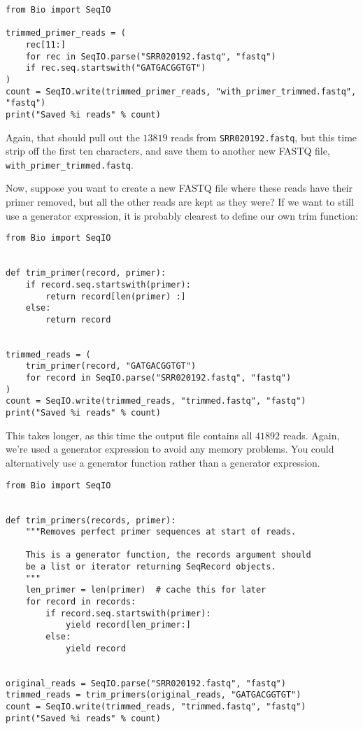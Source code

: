 \begin{verbatim}
from Bio import SeqIO

trimmed_primer_reads = (
    rec[11:]
    for rec in SeqIO.parse("SRR020192.fastq", "fastq")
    if rec.seq.startswith("GATGACGGTGT")
)
count = SeqIO.write(trimmed_primer_reads, "with_primer_trimmed.fastq", "fastq")
print("Saved %i reads" % count)
\end{verbatim}

\noindent Again, that should pull out the $13819$ reads from \texttt{SRR020192.fastq},
but this time strip off the first ten characters, and save them to another new
FASTQ file, \texttt{with\_primer\_trimmed.fastq}.

Now, suppose you want to create a new FASTQ file where these reads have
their primer removed, but all the other reads are kept as they were?
If we want to still use a generator expression, it is probably clearest to
define our own trim function:

\begin{verbatim}
from Bio import SeqIO


def trim_primer(record, primer):
    if record.seq.startswith(primer):
        return record[len(primer) :]
    else:
        return record


trimmed_reads = (
    trim_primer(record, "GATGACGGTGT")
    for record in SeqIO.parse("SRR020192.fastq", "fastq")
)
count = SeqIO.write(trimmed_reads, "trimmed.fastq", "fastq")
print("Saved %i reads" % count)
\end{verbatim}

This takes longer, as this time the output file contains all $41892$ reads.
Again, we're used a generator expression to avoid any memory problems.
You could alternatively use a generator function rather than a generator
expression.

\begin{verbatim}
from Bio import SeqIO


def trim_primers(records, primer):
    """Removes perfect primer sequences at start of reads.

    This is a generator function, the records argument should
    be a list or iterator returning SeqRecord objects.
    """
    len_primer = len(primer)  # cache this for later
    for record in records:
        if record.seq.startswith(primer):
            yield record[len_primer:]
        else:
            yield record


original_reads = SeqIO.parse("SRR020192.fastq", "fastq")
trimmed_reads = trim_primers(original_reads, "GATGACGGTGT")
count = SeqIO.write(trimmed_reads, "trimmed.fastq", "fastq")
print("Saved %i reads" % count)
\end{verbatim}

